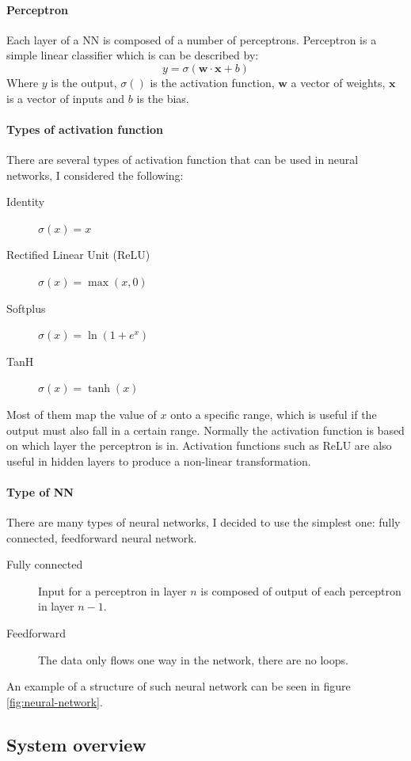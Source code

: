 \documentclass[12pt,a4paper]{book}
\newcommand\bs[1]{\boldsymbol{#1}}
\begin{document}
\paragraph{Perceptron}
Each layer of a NN is composed of a number of perceptrons.
Perceptron is a simple linear classifier which is can be described by:
\begin{equation}
y = \sigma(\bs{w\cdot x}+b)
\end{equation}
Where $y$ is the output, $\sigma()$ is the activation function, $\bs{w}$ a vector of weights, $\bs{x}$ is a vector of inputs and $b$ is the bias.

\paragraph{Types of activation function}
There are several types of activation function that can be used in neural networks, I considered the following:
\begin{description}
\item[Identity] $\sigma(x) = x$
\item[Rectified Linear Unit (ReLU)] $\sigma(x) = \max(x,0)$
\item[Softplus] $\sigma(x) = \ln(1+e^x)$
\item[TanH] $\sigma(x) = \tanh(x)$
\end{description}
Most of them map the value of $x$ onto a specific range, which is useful if the output must also fall in a certain range.
Normally the activation function is based on which layer the perceptron is in.
Activation functions such as ReLU are also useful in hidden layers to produce a non-linear transformation.

\paragraph{Type of NN}
There are many types of neural networks, I decided to use the simplest one: fully connected, feedforward neural network.
\begin{description}
\item[Fully connected] Input for a perceptron in layer $n$ is composed of output of each perceptron in layer $n-1$.
\item[Feedforward] The data only flows one way in the network, there are no loops.
\end{description}
An example of a structure of such neural network can be seen in figure \ref{fig:neural-network}.

\subsection{System overview}
\end{document}
